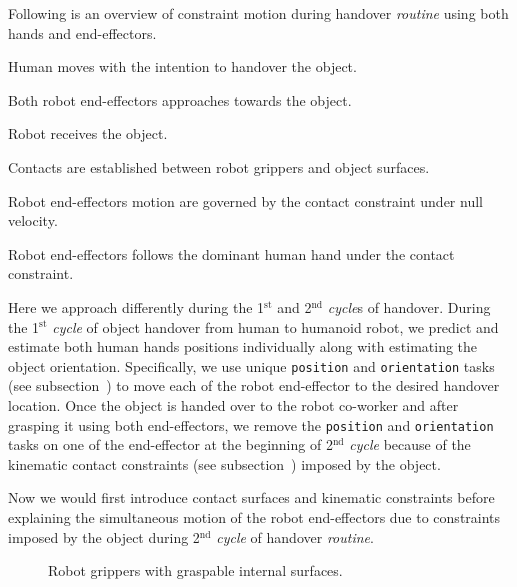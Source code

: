 Following is an overview of constraint motion during handover \textit{routine} using both hands and end-effectors.
\begin{compactitem}
	\item Human moves with the intention to handover the object.
	\item Both robot end-effectors approaches towards the object.
	\item Robot receives the object.
	\item Contacts are established between robot grippers and object surfaces.
	\item Robot end-effectors motion are governed by the contact constraint under null velocity.
	\item Robot end-effectors follows the dominant human hand under the contact constraint.
\end{compactitem}

Here we approach differently during the 1${}^\text{st}$ and 2${}^\text{nd}$ \textit{cycle}s of handover. During the 1${}^\text{st}$ \textit{cycle} of object handover from human to humanoid robot, we predict and estimate both human hands positions individually along with estimating the object orientation. Specifically, we use unique \texttt{position} and \texttt{orientation} tasks (see subsection~) to move each of the robot end-effector to the desired handover location. Once the object is handed over to the robot co-worker and after grasping it using both end-effectors, we remove the \texttt{position} and \texttt{orientation} tasks on one of the end-effector at the beginning of 2${}^\text{nd}$ \textit{cycle} because of the kinematic contact constraints (see subsection~) imposed by the object. 

Now we would first introduce contact surfaces and kinematic constraints before explaining the simultaneous motion of the robot end-effectors due to constraints imposed by the object during 2$^\text{nd}$ \textit{cycle} of handover \textit{routine}.

\begin{figure}[hptb]
	\caption{Robot grippers with graspable internal surfaces.}
	\label{fig:gripper-intern}
\end{figure}



